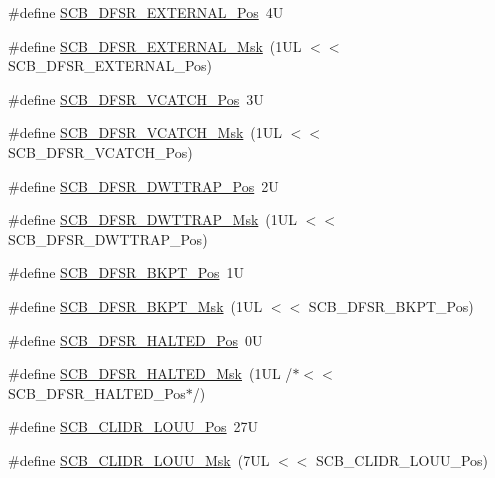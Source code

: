 \begin{DoxyCompactItemize}
\item 
\#define \hyperlink{group___c_m_s_i_s___s_c_b_ga13f502fb5ac673df9c287488c40b0c1d}{S\-C\-B\-\_\-\-D\-F\-S\-R\-\_\-\-E\-X\-T\-E\-R\-N\-A\-L\-\_\-\-Pos}~4\-U
\item 
\#define \hyperlink{group___c_m_s_i_s___s_c_b_ga3cba2ec1f588ce0b10b191d6b0d23399}{S\-C\-B\-\_\-\-D\-F\-S\-R\-\_\-\-E\-X\-T\-E\-R\-N\-A\-L\-\_\-\-Msk}~(1\-U\-L $<$$<$ S\-C\-B\-\_\-\-D\-F\-S\-R\-\_\-\-E\-X\-T\-E\-R\-N\-A\-L\-\_\-\-Pos)
\item 
\#define \hyperlink{group___c_m_s_i_s___s_c_b_gad02d3eaf062ac184c18a7889c9b6de57}{S\-C\-B\-\_\-\-D\-F\-S\-R\-\_\-\-V\-C\-A\-T\-C\-H\-\_\-\-Pos}~3\-U
\item 
\#define \hyperlink{group___c_m_s_i_s___s_c_b_gacbb931575c07b324ec793775b7c44d05}{S\-C\-B\-\_\-\-D\-F\-S\-R\-\_\-\-V\-C\-A\-T\-C\-H\-\_\-\-Msk}~(1\-U\-L $<$$<$ S\-C\-B\-\_\-\-D\-F\-S\-R\-\_\-\-V\-C\-A\-T\-C\-H\-\_\-\-Pos)
\item 
\#define \hyperlink{group___c_m_s_i_s___s_c_b_gaccf82364c6d0ed7206f1084277b7cc61}{S\-C\-B\-\_\-\-D\-F\-S\-R\-\_\-\-D\-W\-T\-T\-R\-A\-P\-\_\-\-Pos}~2\-U
\item 
\#define \hyperlink{group___c_m_s_i_s___s_c_b_ga3f7384b8a761704655fd45396a305663}{S\-C\-B\-\_\-\-D\-F\-S\-R\-\_\-\-D\-W\-T\-T\-R\-A\-P\-\_\-\-Msk}~(1\-U\-L $<$$<$ S\-C\-B\-\_\-\-D\-F\-S\-R\-\_\-\-D\-W\-T\-T\-R\-A\-P\-\_\-\-Pos)
\item 
\#define \hyperlink{group___c_m_s_i_s___s_c_b_gaf28fdce48655f0dcefb383aebf26b050}{S\-C\-B\-\_\-\-D\-F\-S\-R\-\_\-\-B\-K\-P\-T\-\_\-\-Pos}~1\-U
\item 
\#define \hyperlink{group___c_m_s_i_s___s_c_b_ga609edf8f50bc49adb51ae28bcecefe1f}{S\-C\-B\-\_\-\-D\-F\-S\-R\-\_\-\-B\-K\-P\-T\-\_\-\-Msk}~(1\-U\-L $<$$<$ S\-C\-B\-\_\-\-D\-F\-S\-R\-\_\-\-B\-K\-P\-T\-\_\-\-Pos)
\item 
\#define \hyperlink{group___c_m_s_i_s___s_c_b_gaef4ec28427f9f88ac70a13ae4e541378}{S\-C\-B\-\_\-\-D\-F\-S\-R\-\_\-\-H\-A\-L\-T\-E\-D\-\_\-\-Pos}~0\-U
\item 
\#define \hyperlink{group___c_m_s_i_s___s_c_b_ga200bcf918d57443b5e29e8ce552e4bdf}{S\-C\-B\-\_\-\-D\-F\-S\-R\-\_\-\-H\-A\-L\-T\-E\-D\-\_\-\-Msk}~(1\-U\-L /$\ast$$<$$<$ S\-C\-B\-\_\-\-D\-F\-S\-R\-\_\-\-H\-A\-L\-T\-E\-D\-\_\-\-Pos$\ast$/)
\item 
\#define \hyperlink{group___c_m_s_i_s___s_c_b_ga384f04641b96d74495e023cca27ed72f}{S\-C\-B\-\_\-\-C\-L\-I\-D\-R\-\_\-\-L\-O\-U\-U\-\_\-\-Pos}~27\-U
\item 
\#define \hyperlink{group___c_m_s_i_s___s_c_b_ga4a2124def29e03f85d8ab6b455f5a174}{S\-C\-B\-\_\-\-C\-L\-I\-D\-R\-\_\-\-L\-O\-U\-U\-\_\-\-Msk}~(7\-U\-L $<$$<$ S\-C\-B\-\_\-\-C\-L\-I\-D\-R\-\_\-\-L\-O\-U\-U\-\_\-\-Pos)
$$
\end{DoxyCompactItemize}
